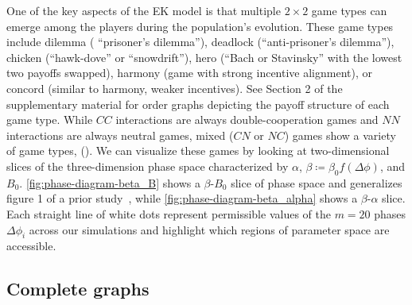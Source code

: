 \documentclass[pdflatex,twocolumn,sn-nature,super]{sn-jnl}
\begin{document}
One of the key aspects of the EK model
is that multiple $2 \times 2$ game types can emerge
among the players during the population's evolution.
These game types~\citep{bruns2015names} include
dilemma (\aka{} ``prisoner's dilemma''),
deadlock (``anti-prisoner's dilemma''),
chicken (``hawk-dove'' or ``snowdrift''),
hero (``Bach or Stavinsky'' with the lowest two payoffs swapped),
harmony (game with strong incentive alignment),
or
concord (similar to harmony, weaker incentives).
See Section 2 of the supplementary material
for order graphs depicting the payoff structure of each game type.
While $CC$ interactions are always double-cooperation games
and $NN$ interactions are always neutral games,
mixed ($CN$ or $NC$) games show a variety of game types,
().
We can visualize these games
by looking at two-dimensional slices
of the three-dimension phase space
characterized by $\alpha$, $\beta \coloneqq \beta_0 f(\Delta \phi)$,
and $B_0$.
\cref{fig:phase-diagram-beta_B} shows a $\beta$-$B_0$ slice of phase space
and generalizes figure 1 of a prior study~\citep{tripp2022evolutionary},
while \cref{fig:phase-diagram-beta_alpha} shows a $\beta$-$\alpha$ slice.
Each straight line of white dots represent permissible values of the $m = 20$ phases
$\Delta \phi_i$ across our simulations
and highlight which regions of parameter space are accessible.

\subsection{Complete graphs}\label{sec:complete_graph}
\end{document}
